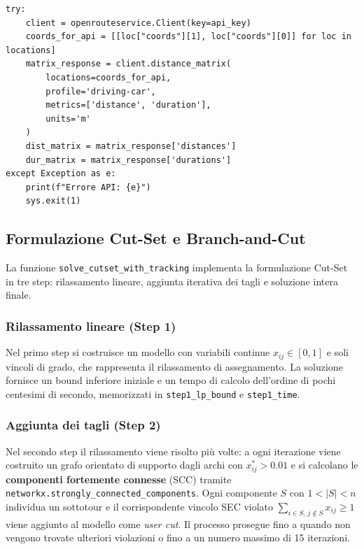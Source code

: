 \documentclass[a4paper,12pt]{article}
\begin{document}
\begin{lstlisting}[caption={Richiesta matrici reali tramite API OpenRouteService},label={lst:api}]
try:
    client = openrouteservice.Client(key=api_key)
    coords_for_api = [[loc["coords"][1], loc["coords"][0]] for loc in locations]
    matrix_response = client.distance_matrix(
        locations=coords_for_api,
        profile='driving-car',
        metrics=['distance', 'duration'],
        units='m'
    )
    dist_matrix = matrix_response['distances']
    dur_matrix = matrix_response['durations']
except Exception as e:
    print(f"Errore API: {e}")
    sys.exit(1)
\end{lstlisting}

\subsection{Formulazione Cut-Set e Branch-and-Cut}

La funzione \texttt{solve\_cutset\_with\_tracking} implementa la formulazione Cut-Set in tre step: rilassamento lineare, aggiunta iterativa dei tagli e soluzione intera finale.

\subsubsection*{Rilassamento lineare (Step 1)}

Nel primo step si costruisce un modello con variabili continue \(x_{ij}\in[0,1]\) e soli vincoli di grado, che rappresenta il rilassamento di assegnamento. 
La soluzione fornisce un bound inferiore iniziale e un tempo di calcolo dell’ordine di pochi centesimi di secondo, memorizzati in \texttt{step1\_lp\_bound} e \texttt{step1\_time}.

\subsubsection*{Aggiunta dei tagli (Step 2)}

Nel secondo step il rilassamento viene risolto più volte: a ogni iterazione viene costruito un grafo orientato di supporto dagli archi con $x^*_{ij}>0.01$ e si calcolano le \textbf{componenti fortemente connesse} (SCC) tramite \texttt{networkx.strongly\_connected\_components}. Ogni componente $S$ con $1<|S|<n$ individua un sottotour e il corrispondente vincolo SEC violato $\sum_{i\in S,\,j\notin S} x_{ij}\ge 1$ viene aggiunto al modello come \textit{user cut}. Il processo prosegue fino a quando non vengono trovate ulteriori violazioni o fino a un numero massimo di 15 iterazioni.
\end{document}
